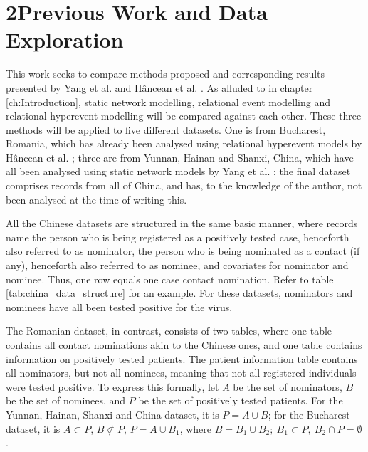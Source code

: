 \chapter{2\quad Previous Work and Data Exploration}
\label{ch:previous_work_data}

This work seeks to compare methods proposed and corresponding results presented by Yang et al. \cite{shaanxi_publication,hainan_publication} and Hâncean et al. \cite{hancean2022occupations}. As alluded to in chapter \ref{ch:Introduction}, static network modelling, relational event modelling and relational hyperevent modelling will be compared against each other. These three methods will be applied to five different datasets. One is from Bucharest, Romania, which has already been analysed using relational hyperevent models by Hâncean et al. \cite{hancean2022occupations}; three are from Yunnan, Hainan and Shanxi, China, which have all been analysed using static network models by Yang et al. \cite{hainan_publication,shaanxi_publication}; the final dataset comprises records from all of China, and has, to the knowledge of the author, not been analysed at the time of writing this.

All the Chinese datasets are structured in the same basic manner, where records name the person who is being registered as a positively tested case, henceforth also referred to as nominator, the person who is being nominated as a contact (if any), henceforth also referred to as nominee, and covariates for nominator and nominee. Thus, one row equals one case contact nomination. Refer to table \ref{tab:china_data_structure} for an example. For these datasets, nominators and nominees have all been tested positive for the virus.

The Romanian dataset, in contrast, consists of two tables, where one table contains all contact nominations akin to the Chinese ones, and one table contains information on positively tested patients. The patient information table contains all nominators, but not all nominees, meaning that not all registered individuals were tested positive. 
To express this formally, let $A$ be the set of nominators, $B$ be the set of nominees, and $P$ be the set of positively tested patients. For the Yunnan, Hainan, Shanxi and China dataset, it is $P = A \cup B$; for the Bucharest dataset, it is $A \subset P$, $B \not\subset P$, $P = A \cup B_1$, where $B = B_1 \cup B_2;\: B_1 \subset P,\: B_2 \cap P = \emptyset$.

